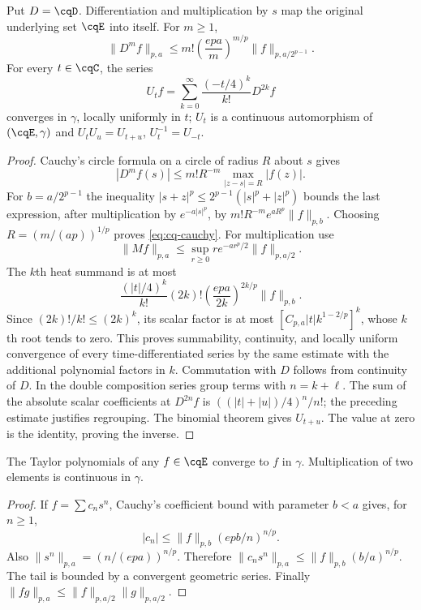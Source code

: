 \begin{cqlemma}\label{thm:cq-heat}
Put $D=\cqD$. Differentiation and multiplication by $s$ map the
original underlying set $\cqE$ into itself. For $m\geq1$,
\begin{equation}\label{eq:cq-cauchy}
 \|D^mf\|_{p,a}\leq
 m!\left(\frac{epa}{m}\right)^{m/p}
 \|f\|_{p,a/2^{p-1}}.
\end{equation}
For every $t\in\cqC$, the series
\begin{equation}\label{eq:cq-U}
 U_tf=\sum_{k=0}^\infty\frac{(-t/4)^k}{k!}D^{2k}f
\end{equation}
converges in $\gamma$, locally uniformly in $t$; $U_t$ is a
continuous automorphism of $(\cqE,\gamma)$ and
$U_tU_u=U_{t+u}$, $U_t^{-1}=U_{-t}$.
\end{cqlemma}
\begin{proof}
Cauchy's circle formula on a circle of radius $R$ about $s$ gives
\[
 |D^mf(s)|\leq m!R^{-m}\max_{|z-s|=R}|f(z)|.
\]
For $b=a/2^{p-1}$ the inequality
$|s+z|^p\leq2^{p-1}(|s|^p+|z|^p)$ bounds the last expression,
after multiplication by $e^{-a|s|^p}$, by
$m!R^{-m}e^{aR^p}\|f\|_{p,b}$. Choosing
$R=(m/(ap))^{1/p}$ proves \eqref{eq:cq-cauchy}.
For multiplication use
\[
 \|Mf\|_{p,a}\leq\sup_{r\geq0}re^{-ar^p/2}\|f\|_{p,a/2}.
\]
The $k$th heat summand is at most
\[
 \frac{(|t|/4)^k}{k!}(2k)!
       \left(\frac{epa}{2k}\right)^{2k/p}\|f\|_{p,b}.
\]
Since $(2k)!/k!\leq(2k)^k$, its scalar factor is at most
$[C_{p,a}|t|k^{1-2/p}]^k$, whose $k$th root tends to zero.
This proves summability, continuity, and locally uniform convergence
of every time-differentiated series by the same estimate with the
additional polynomial factors in $k$. Commutation with $D$ follows
from continuity of $D$. In the double composition series group
terms with $n=k+\ell$. The sum of the absolute scalar coefficients
at $D^{2n}f$ is $( (|t|+|u|)/4)^n/n!$; the preceding estimate
justifies regrouping. The binomial theorem gives $U_{t+u}$.
The value at zero is the identity, proving the inverse.
\end{proof}

\begin{cqlemma}\label{thm:cq-density}
The Taylor polynomials of any $f\in\cqE$ converge to $f$ in $\gamma$.
Multiplication of two elements is continuous in $\gamma$.
\end{cqlemma}
\begin{proof}
If $f=\sum c_ns^n$, Cauchy's coefficient bound with parameter
$b<a$ gives, for $n\geq1$,
\[
 |c_n|\leq\|f\|_{p,b}(epb/n)^{n/p}.
\]
Also $\|s^n\|_{p,a}=(n/(epa))^{n/p}$. Therefore
$\|c_ns^n\|_{p,a}\leq\|f\|_{p,b}(b/a)^{n/p}$.
The tail is bounded by a convergent geometric series.
Finally $\|fg\|_{p,a}\leq\|f\|_{p,a/2}\|g\|_{p,a/2}$.
\end{proof}

